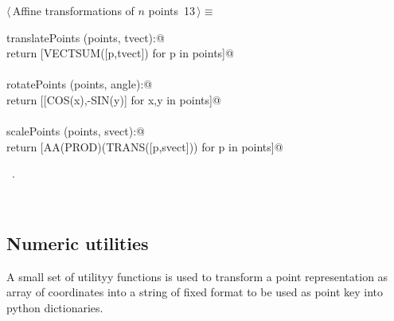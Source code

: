 \documentclass[11pt,oneside]{article}	%
\begin{document}
\begin{flushleft} \small
\begin{minipage}{\linewidth} \label{scrap38}
\protect{}$\langle\,$Affine transformations of $n$ points\nobreak\ {\footnotesize 13}$\,\rangle\equiv$
\vspace{-1ex}
\begin{list}{}{} \item
\mbox{}\verb@def translatePoints (points, tvect):@\\
\mbox{}\verb@   return [VECTSUM([p,tvect]) for p in points]@\\
\mbox{}\verb@@\\
\mbox{}\verb@def rotatePoints (points, angle):@\\
\mbox{}\verb@   return [[COS(x),-SIN(y)] for x,y in points]@\\
\mbox{}\verb@@\\
\mbox{}\verb@def scalePoints (points, svect):@\\
\mbox{}\verb@   return [AA(PROD)(TRANS([p,svect])) for p in points]@\\
\mbox{}\verb@@{\NWsep}
\end{list}
\vspace{-1ex}
\footnotesize\addtolength{\baselineskip}{-1ex}
\begin{list}{}{\setlength{\itemsep}{-\parsep}\setlength{\itemindent}{-\leftmargin}}
\item \NWtxtMacroRefIn\ .
\end{list}
\end{minipage}\\[4ex]
\end{flushleft}

\subsection{Numeric utilities}

A small set of utilityy functions is used to transform a point representation as array of coordinates into a string of fixed format to be used as point key into python dictionaries.
\end{document}
